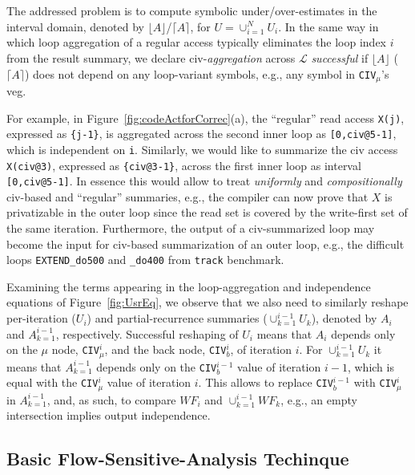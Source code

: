 \documentclass{sig-alternate}
\begin{document}
The addressed problem is to compute symbolic under/over-estimates in the 
interval domain, denoted by $\lfloor A \rfloor$/$\lceil A \rceil$, 
for $U = \cup_{i=1}^{N} U_i$.
%
In the same way in which loop aggregation of a regular access  
typically eliminates the loop index $i$ from the result summary,
we declare {\sc civ}-{\em aggregation} across $\mathcal{L}$ {\em successful} 
if $\lfloor A \rfloor$ ($\lceil A \rceil$) does not depend on any loop-variant
symbols, e.g., any symbol in {\tt CIV}$_{\mu}$'s  {\sc veg}. %

For example, in Figure~\ref{fig:codeActforCorrec}(a), the ``regular'' 
read access {\tt X(j)}, expressed as {\tt\{j-1\}}, is aggregated across 
the second inner loop as {\tt[0,civ@5-1]}, which is independent on {\tt i}. 
Similarly, we would like to summarize the {\sc civ} access
{\tt X(civ@3)}, expressed as {\tt\{civ@3-1\}}, across 
the first inner loop as interval {\tt[0,civ@5-1]}. 
%
In essence this would allow to treat {\em uniformly} and {\em compositionally} 
{\sc civ}-based and ``regular'' summaries, e.g., the compiler can now prove that $X$ 
is privatizable in the outer loop since the read set is covered by the write-first 
set of the same iteration. 
Furthermore, the output of a {\sc civ}-summarized loop may 
become the input for {\sc civ}-based summarization of an outer loop,
e.g., the difficult loops {\tt EXTEND\_do500} and {\tt \_do400}
from {\tt track} benchmark.


%
Examining the terms appearing in the loop-aggregation and independence 
equations of Figure~\ref{fig:UsrEq}, we observe that we also need to similarly
reshape per-iteration ($U_i$) and partial-recurrence summaries ($\cup_{k=1}^{i-1} U_k$), 
denoted by $A_i$ and $A_{k=1}^{i-1}$, respectively. 
%
Successful reshaping of $U_i$ means that $A_i$
depends only on the $\mu$ node, {\tt CIV}$_{\mu}^{i}$, 
and the back node, {\tt CIV}$_{b}^{i}$, of iteration $i$.
For $\cup_{k=1}^{i-1} U_k$ it means that $A_{k=1}^{i-1}$ depends
only on the {\tt CIV}$_{b}^{i-1}$ value of iteration $i-1$, which is
equal with the  {\tt CIV}$_{\mu}^{i}$ value of iteration $i$.
This allows to replace {\tt CIV}$_b^{i-1}$ with {\tt CIV}$_{\mu}^i$ in
$A_{k=1}^{i-1}$, and, as such, to compare $WF_i$ and $\cup_{k=1}^{i-1} WF_k$, 
e.g., an empty intersection implies output independence. 
%

\subsection{Basic Flow-Sensitive-Analysis Techinque}
\label{subsec:BasicTechn}
\end{document}
